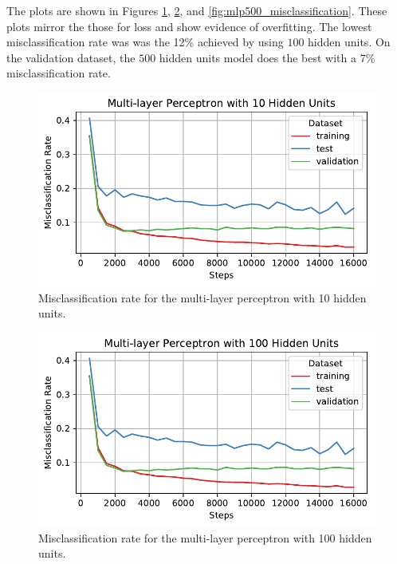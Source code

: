 \documentclass[letterpaper,11pt]{article}
\begin{document}
\begin{enumerate}
    The plots are shown in Figures \ref{fig:mlp10_misclassification},
    \ref{fig:mlp100_misclassification}, and
    \ref{fig:mlp500_misclassification}. These plots mirror the those for loss
    and show evidence of overfitting. The lowest misclassification rate was was
    the 12\% achieved by using $100$ hidden units. On the validation dataset, the
    $500$ hidden units model does the best with a 7\% misclassification rate.

    \begin{figure}
      \centering
      \includegraphics{problem6/mlp10_misclassification.pdf}
      \caption{Misclassification rate for the multi-layer perceptron with 10 hidden units.}
      \label{fig:mlp10_misclassification}
    \end{figure}
    
    \begin{figure}
      \centering
      \includegraphics{problem6/mlp100_misclassification.pdf}
      \caption{Misclassification rate for the multi-layer perceptron with 100 hidden units.}
      \label{fig:mlp100_misclassification}
    \end{figure}
    

\end{enumerate}
\end{document}

